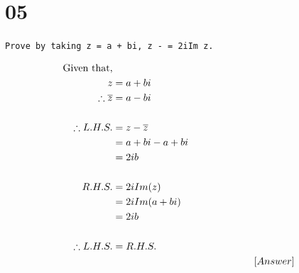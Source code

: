 \documentclass[12pt]{article}
\begin{document}
\vspace{20mm}

                
\chapter{05}
\texttt{Prove by taking z = a + bi, z -  = 2iIm z.}

\begin{align*}
    \text{Given that,}
    \\
    z &= a + bi
    \\
    \therefore \overline{z} &= a - b i
    \\ \\
    \therefore L. H. S. &= z - \overline{z}
    \\
    &= a + bi - a + bi
    \\
    &= 2 ib
    \\ \\
    R. H. S. &= 2 i Im (z)
    \\
    &= 2 i Im(a+bi)
    \\
    &= 2 ib
    \\ \\
    \therefore L. H. S. &= R. H. S.
    \\
    \vspace{20mm}
    &\hspace{50mm} [Answer]
\end{align*}
\end{document}

